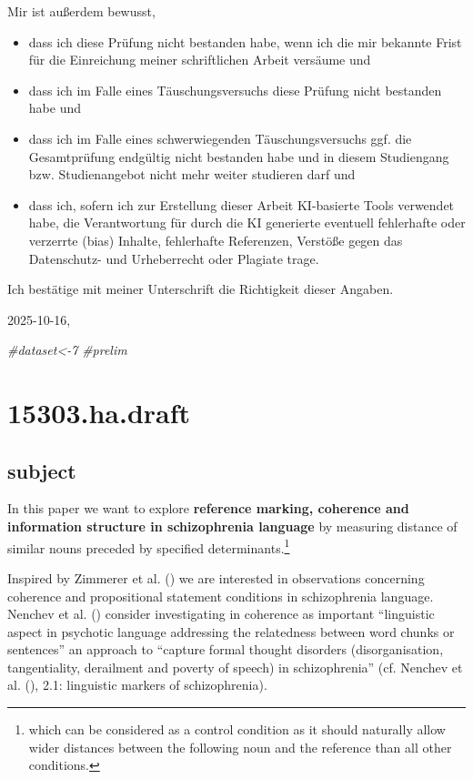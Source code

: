 \documentclass[
  12pt,
  oneside]{book}
\newenvironment{Shaded}{\begin{snugshade}}{\end{snugshade}}
\newcommand{\CommentTok}[1]{\textcolor[rgb]{0.56,0.35,0.01}{\textit{#1}}}
\providecommand{\tightlist}{%
  \setlength{\itemsep}{0pt}\setlength{\parskip}{0pt}}
\begin{document}
Mir ist außerdem bewusst,

\begin{itemize}
\tightlist
\item
  dass ich diese Prüfung nicht bestanden habe, wenn ich die mir bekannte Frist für die Einreichung meiner schriftlichen Arbeit versäume und
\item
  dass ich im Falle eines Täuschungsversuchs diese Prüfung nicht bestanden habe und
\item
  dass ich im Falle eines schwerwiegenden Täuschungsversuchs ggf. die Gesamtprüfung endgültig nicht bestanden habe und in diesem Studiengang bzw. Studienangebot nicht mehr weiter studieren darf und
\item
  dass ich, sofern ich zur Erstellung dieser Arbeit KI-basierte Tools verwendet habe, die Verantwortung für durch die KI generierte eventuell fehlerhafte oder verzerrte (bias) Inhalte, fehlerhafte Referenzen, Verstöße gegen das Datenschutz- und Urheberrecht oder Plagiate trage.
\end{itemize}

Ich bestätige mit meiner Unterschrift die Richtigkeit dieser Angaben.

2025-10-16,

\clearpage

\begin{Shaded}
\begin{Highlighting}[]
\CommentTok{\#dataset\textless{}{-}7}
\CommentTok{\#prelim}
\end{Highlighting}
\end{Shaded}

\chapter{15303.ha.draft}\label{ha.draft}

\section{subject}\label{subject}

In this paper we want to explore \textbf{reference marking, coherence and information structure in schizophrenia language} by measuring distance of similar nouns preceded by specified determinants.\footnote{which can be considered as a control condition as it should naturally allow wider distances between the following noun and the reference than all other conditions.}

Inspired by Zimmerer et al. () we are interested in observations concerning coherence and propositional statement conditions in schizophrenia language. Nenchev et al. () consider investigating in coherence as important ``linguistic aspect in psychotic language addressing the relatedness between word chunks or sentences'' an approach to ``capture formal thought disorders (disorganisation, tangentiality, derailment and poverty of speech) in schizophrenia'' (cf. Nenchev et al. (), 2.1: linguistic markers of schizophrenia).
\end{document}
